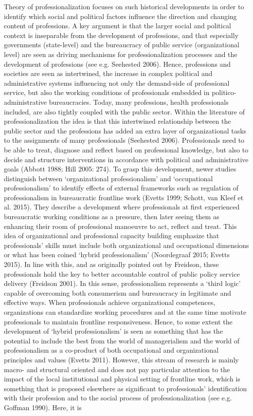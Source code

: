 Theory of professionalization focuses on such historical developments in order to identify which social and political factors influence the direction and changing content of professions. A key argument is that the larger social and political context is inseparable from the development of professions, and that especially governments (state-level) and the bureaucracy of public service (organizational level) are seen as driving mechanisms for professionalization processes and the development of professions (see e.g. Seehested 2006). Hence, professions and societies are seen as intertwined, the increase in complex political and administrative systems influencing not only the demand-side of professional service, but also the working conditions of professionals embedded in politico-administrative bureaucracies. Today, many professions, health professionals included, are also tightly coupled with the public sector. Within the literature of professionalization the idea is that this intertwined relationship between the public sector and the professions has added an extra layer of organizational tasks to the assignments of many professionals (Seehested 2006). Professionals need to be able to treat, diagnose and reflect based on professional knowledge, but also to decide and structure interventions in accordance with political and administrative goals (Abbott 1988; Hill 2005: 274). To grasp this development, newer studies distinguish between ‘organizational professionalism’ and ‘occupational professionalism’ to identify effects of external frameworks such as regulation of professionalism in bureaucratic frontline work (Evetts 1999; Schott, van Kleef et al. 2015). They describe a development where professionals at first experienced bureaucratic working conditions as a pressure, then later seeing them as enhancing their room of professional manoeuvre to act, reflect and treat. This idea of organizational and professional capacity building emphasize that professionals’ skills must include both organizational and occupational dimensions or what has been coined ‘hybrid professionalism’ (Noordegraaf 2015; Evetts 2015). In line with this, and as originally pointed out by Freidson, these professionals hold the key to better accountable control of public policy service delivery (Freidson 2001). In this sense, professionalism represents a ‘third logic’ capable of overcoming both consumerism and bureaucracy in legitimate and effective ways. When professionals achieve organizational competences, organizations can standardize working procedures and at the same time motivate professionals to maintain frontline responsiveness. Hence, to some extent the development of ‘hybrid professionalism’ is seen as something that has the potential to include the best from the world of managerialism and the world of professionalism as a co-product of both occupational and organizational principles and values (Evetts 2011). However, this stream of research is mainly macro- and structural oriented and does not pay particular attention to the impact of the local institutional and physical setting of frontline work, which is something that is proposed elsewhere as significant to professionals’ identification with their profession and to the social process of professionalization (see e.g. Goffman 1990). Here, it is 